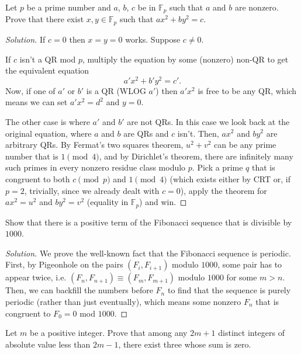 \documentclass[11pt]{scrartcl}
\providecommand{\FF}{\mathbb F}
\newenvironment{soln}{\begin{proof}[Solution]}{\end{proof}}
\begin{document}
\begin{problem}
	Let $p$ be a prime number and $a$, $b$, $c$ be in $\FF_p$ such that
	$a$ and $b$ are nonzero. Prove that there exist $x,y\in\FF_p$ such that
	$ax^2 + by^2 = c$.
\end{problem}

\begin{soln}
	If $c = 0$ then $x = y = 0$ works. Suppose $c\ne 0$.
	
	If $c$ isn't a QR mod $p$, multiply the equation by some (nonzero) non-QR
	to get the equivalent equation
	\[a'x^2 + b'y^2 = c'.\]
	Now, if one of $a'$ or $b'$ is a QR (WLOG $a'$) then
	$a'x^2$ is free to be any QR, which means we can set
	$a'x^2 = d^2$ and $y = 0$.
	
	The other case is where $a'$ and $b'$ are not QRs.
	In this case we look back at the original equation,
	where $a$ and $b$ are QRs and $c$ isn't.
	Then, $ax^2$ and $by^2$ are arbitrary QRs.
	By Fermat's two squares theorem, $u^2 + v^2$ can be any prime number
	that is $1\pmod 4$, and by Dirichlet's theorem,
	there are infinitely many such primes in every nonzero residue class
	modulo $p$. Pick a prime $q$ that is congruent
	to both $c\pmod p$ and $1\pmod 4$
	(which exists either by CRT or, if $p = 2$, trivially, since we
	already dealt with $c = 0$),
	apply the theorem for $ax^2 = u^2$ and $by^2 = v^2$
	(equality in $\FF_p$) and win.
\end{soln}

\begin{problem}
	Show that there is a positive term of the Fibonacci sequence
	that is divisible by $1000$.
\end{problem}

\begin{soln}
	We prove the well-known fact that the Fibonacci sequence is periodic.
	First, by Pigeonhole on the pairs $(F_i, F_{i+1})$ modulo $1000$,
	some pair has to appear twice, i.e. $(F_n, F_{n+1})\equiv(F_{m},F_{m+1})$
	modulo $1000$ for some $m > n$.
	Then, we can backfill the numbers before $F_n$ to find that
	the sequence is purely periodic (rather than just eventually),
	which means some nonzero $F_n$ that is congruent to $F_0 = 0$ mod $1000$.
\end{soln}

\begin{problem}
	Let $m$ be a positive integer.
	Prove that among any $2m + 1$ distinct integers
	of absolute value less than $2m - 1$,
	there exist three whose sum is zero.
\end{problem}
\end{document}
